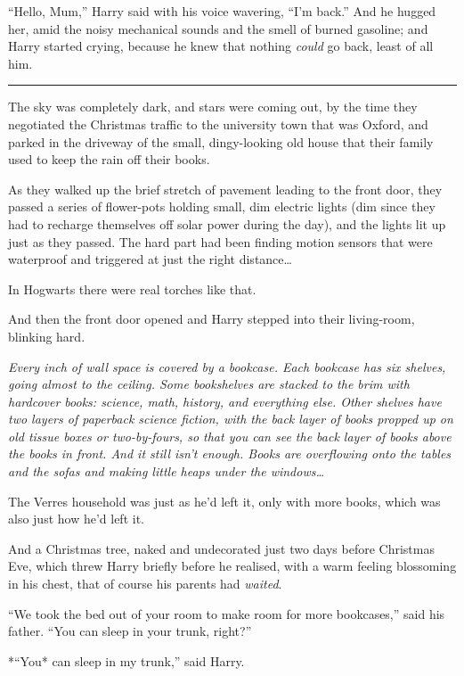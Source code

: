 ``Hello, Mum,'' Harry said with his voice wavering, ``I'm back.'' And he
hugged her, amid the noisy mechanical sounds and the smell of burned
gasoline; and Harry started crying, because he knew that nothing
\emph{could} go back, least of all him.

\begin{center}\rule{3in}{0.4pt}\end{center}

The sky was completely dark, and stars were coming out, by the time they
negotiated the Christmas traffic to the university town that was Oxford,
and parked in the driveway of the small, dingy-looking old house that
their family used to keep the rain off their books.

As they walked up the brief stretch of pavement leading to the front
door, they passed a series of flower-pots holding small, dim electric
lights (dim since they had to recharge themselves off solar power during
the day), and the lights lit up just as they passed. The hard part had
been finding motion sensors that were waterproof and triggered at just
the right distance\ldots{}

In Hogwarts there were real torches like that.

And then the front door opened and Harry stepped into their living-room,
blinking hard.

\emph{Every inch of wall space is covered by a bookcase. Each bookcase
has six shelves, going almost to the ceiling. Some bookshelves are
stacked to the brim with hardcover books: science, math, history, and
everything else. Other shelves have two layers of paperback science
fiction, with the back layer of books propped up on old tissue boxes or
two-by-fours, so that you can see the back layer of books above the
books in front. And it still isn't enough. Books are overflowing onto
the tables and the sofas and making little heaps under the
windows\ldots{}}

The Verres household was just as he'd left it, only with more books,
which was also just how he'd left it.

And a Christmas tree, naked and undecorated just two days before
Christmas Eve, which threw Harry briefly before he realised, with a warm
feeling blossoming in his chest, that of course his parents had
\emph{waited}.

``We took the bed out of your room to make room for more bookcases,''
said his father. ``You can sleep in your trunk, right?''

*``You* can sleep in my trunk,'' said Harry.

